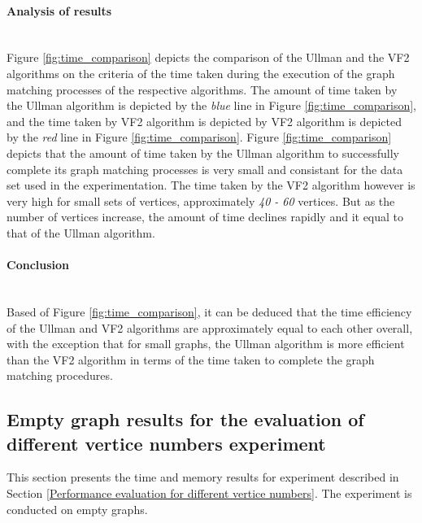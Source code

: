 \paragraph{Analysis of results}\mbox{}\\
\label{Analysis of time results}
Figure \ref{fig:time_comparison} depicts the comparison of the Ullman and the VF2 algorithms on the criteria of the time taken during the execution of the graph matching processes
of the respective algorithms.\newline\newline
The amount of time taken by the Ullman algorithm is depicted by the \textit{blue} line in Figure \ref{fig:time_comparison}, and the time taken by VF2 algorithm 
is depicted by VF2 algorithm is depicted by the \textit{red} line in Figure \ref{fig:time_comparison}.\newline\newline
Figure \ref{fig:time_comparison} depicts that the amount of time taken by the Ullman algorithm to successfully complete its graph matching processes is very 
small and consistant for the data set used in the experimentation.\newline\newline
The time taken by the VF2 algorithm however is very high for small sets of vertices, approximately \textit{40 - 60} vertices. But as the number of vertices 
increase, the amount of time declines rapidly and it equal to that of the Ullman algorithm.

\paragraph{Conclusion}\mbox{}\\
\label{Conclusion of time results}
Based of Figure \ref{fig:time_comparison}, it can be deduced that the time efficiency of the Ullman and VF2 algorithms are approximately equal to each other overall,
with the exception that for small graphs, the Ullman algorithm is more efficient than the VF2 algorithm in terms of the time taken to complete the graph matching
procedures.

\subsection{Empty graph results for the evaluation of different vertice numbers experiment}
This section presents the time and memory results for experiment described in Section \ref{Performance evaluation for different vertice numbers}. The 
experiment is conducted on empty graphs.
